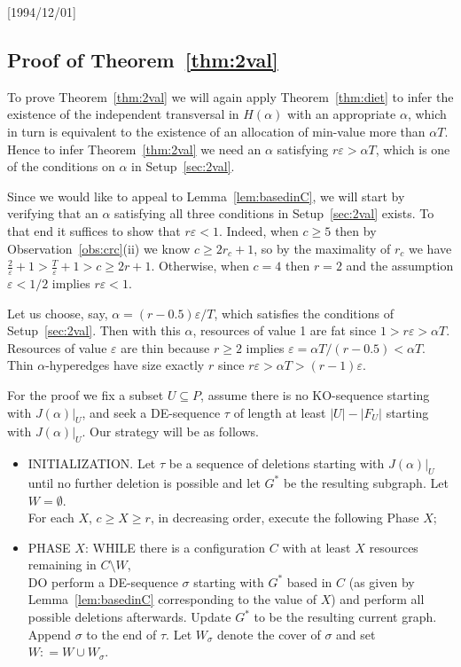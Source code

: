 \NeedsTeXFormat{LaTeX2e}[1994/12/01]\documentclass[letterpaper, 11pt]{article}
\theoremstyle{definition}
\theoremstyle{remark}
\numberwithin{equation}{section}
\newcommand{\veps}{\varepsilon}
\begin{document}
\subsection{Proof of Theorem~\ref{thm:2val}}\label{ineq}

To prove Theorem~\ref{thm:2val} we will again apply Theorem~\ref{thm:diet} to infer
the existence of the independent transversal in $H(\alpha)$ with an appropriate $\alpha$, which in turn is equivalent to the existence of an allocation of min-value more than $\alpha T$. Hence to infer Theorem~\ref{thm:2val} we need an $\alpha$  satisfying  $r\veps  > \alpha T$, which is one of the conditions on $\alpha$ in Setup~\ref{sec:2val}. 


Since we would like to appeal to Lemma~\ref{lem:basedinC}, we will start by verifying that an $\alpha$ satisfying all three conditions in Setup~\ref{sec:2val} exists. To that end it suffices to show that $r\veps < 1$. Indeed, when $c\geq 5$ then 
by Observation~\ref{obs:crc}(ii) we know $c\geq 2r_c+1$,
so by the maximality of $r_c$ we have  $\frac{2}{\varepsilon}+1>\frac{T}{\varepsilon}+1>c\geq 2r+1$. 
Otherwise, when $c=4$ then $r=2$ and the assumption $\varepsilon<1/2$
implies  $r\varepsilon<1$. 

Let us choose, say, $\alpha = (r-0.5)\veps/T$, which satisfies the conditions of Setup~\ref{sec:2val}. 
Then with this $\alpha$, resources of value 1 are fat since $1 > r\veps > \alpha T $. Resources of value $\veps$ are thin because $r\geq 2$ implies $\veps =\alpha T/(r-0.5)<\alpha T$. Thin $\alpha$-hyperedges have size exactly $r$ since $r\veps > \alpha T>(r-1)\veps$.

For the proof we fix a subset $U\subseteq P$, 
assume there is no KO-sequence starting with $J(\alpha)|_U$, and seek
a DE-sequence $\tau$ of length at least $|U| - |F_U|$ starting with
$J(\alpha)|_U$.  Our strategy will be as follows. 
\begin{itemize}
\item[] {\small INITIALIZATION.} Let $\tau$ be a sequence of deletions
  starting with $J(\alpha)|_U$ until no further deletion is possible and
  let $G^*$ be the resulting subgraph. Let $W=\emptyset$. 
  \\[1mm]
  For each $X$, $c\geq X\geq r$, in
 decreasing order, execute the following Phase $X$;
\item[] {\small PHASE $X$:} {\small WHILE} there is a configuration $C$
  with at least $X$    resources remaining in $C\setminus W$, \\
  {\small DO} perform a DE-sequence $\sigma$ starting with $G^*$ based
in $C$ (as given by Lemma~\ref{lem:basedinC} corresponding to the value 
of $X$) and perform all possible deletions afterwards. Update $G^*$ to be the resulting current graph. 
Append $\sigma$ to the end of $\tau$.
Let $W_{\sigma}$ denote the cover of $\sigma$ and set $W: = W \cup W_{\sigma}$.
\end{itemize}
\end{document}
